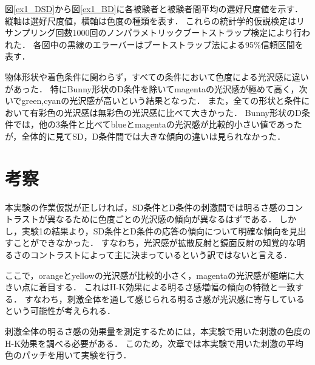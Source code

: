             図\ref{ex1_DSD}から図\ref{ex1_BD}に各被験者と被験者間平均の選好尺度値を示す．
            縦軸は選好尺度値，横軸は色度の種類を表す．
            これらの統計学的仮説検定はリサンプリング回数1000回のノンパラメトリックブートストラップ検定により行われた．
            各図中の黒線のエラーバーはブートストラップ法による95\%信頼区間を表す．

            物体形状や着色条件に関わらず，すべての条件において色度による光沢感に違いがあった．
            特にBunny形状のD条件を除いてmagentaの光沢感が極めて高く，次いでgreen,cyanの光沢感が高いという結果となった．
            また，全ての形状と条件において有彩色の光沢感は無彩色の光沢感に比べて大きかった．
            Bunny形状のD条件では，他の3条件と比べてblueとmagentaの光沢感が比較的小さい値であったが，全体的に見てSD，D条件間では大きな傾向の違いは見られなかった．

    \section{考察}

        本実験の作業仮説が正しければ，SD条件とD条件の刺激間では明るさ感のコントラストが異なるために色度ごとの光沢感の傾向が異なるはずである．
        しかし，実験1の結果より，SD条件とD条件の応答の傾向について明確な傾向を見出すことができなかった．
        すなわち，光沢感が拡散反射と鏡面反射の知覚的な明るさのコントラストによって主に決まっているという訳ではないと言える．

        ここで，orangeとyellowの光沢感が比較的小さく，magentaの光沢感が極端に大きい点に着目する．
        これはH-K効果による明るさ感増幅の傾向の特徴と一致する．
        すなわち，刺激全体を通して感じられる明るさ感が光沢感に寄与しているという可能性が考えられる．

        刺激全体の明るさ感の効果量を測定するためには，本実験で用いた刺激の色度のH-K効果を調べる必要がある．
        このため，次章では本実験で用いた刺激の平均色のパッチを用いて実験を行う．

    \newpage
